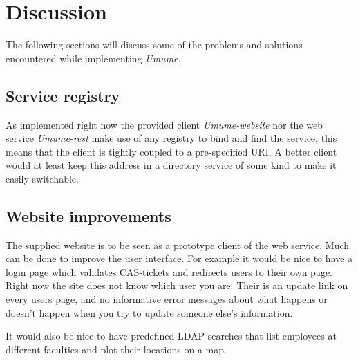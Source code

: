 \documentclass[titlepage, twocolumn, a4paper, 10pt]{article}
\begin{document}
\section{Discussion}\label{sec:discussion}
The following sections will discuss some of the problems and solutions
encountered while implementing \textit{Umume}.


\subsection{Service registry}
As implemented right now the provided client \textit{Umume-website}
nor the web service \textit{Umume-rest} make use of any registry to
bind and find the service, this means that the client is tightly
coupled to a pre-specified URI. A better client would at least keep
this address in a directory service of some kind to make it easily
switchable.

\subsection{}

\subsection{Website improvements}
The supplied website is to be seen as a prototype client of the web
service. Much can be done to improve the user interface. For example
it would be nice to have a login page which validates CAS-tickets and
redirects users to their own page. Right now the site does not know
which user you are. Their is an update link on every users page, and
no informative error messages about what happens or doesn't happen
when you try to update someone else's information.

It would also be nice to have predefined LDAP searches that list
employees at different faculties and plot their locations on a map.
\end{document}
